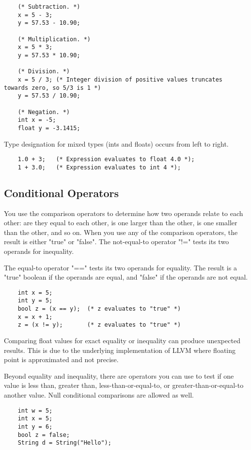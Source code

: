\begin{homeworkProblem}
\begin{verbatim}
	(* Subtraction. *)
	x = 5 - 3;
	y = 57.53 - 10.90;
	
	(* Multiplication. *)
	x = 5 * 3;
	y = 57.53 * 10.90;
	
	(* Division. *)
	x = 5 / 3; (* Integer division of positive values truncates towards zero, so 5/3 is 1 *)
	y = 57.53 / 10.90;
	
	(* Negation. *)
	int x = -5;
	float y = -3.1415;
	\end{verbatim}

	Type designation for mixed types (ints and floats) occurs from left to right.

	\begin{verbatim}
	1.0 + 3;   (* Expression evaluates to float 4.0 *);
	1 + 3.0;   (* Expression evaluates to int 4 *);
	\end{verbatim}
	
	\subsection{Conditional Operators}
	
	You use the comparison operators to determine how two operands relate to each other: are they equal to each other, is one larger than the other, is one smaller than the other, and so on. When you use any of the comparison operators, the result is either "true" or "false". The not-equal-to operator "!=" tests its two operands for inequality.
	
	The equal-to operator "==" tests its two operands for equality. The result is a "true" boolean if the operands are equal, and "false" if the operands are not equal.
	\begin{verbatim}
	int x = 5;
	int y = 5;
	bool z = (x == y);  (* z evaluates to "true" *)
	x = x + 1;
	z = (x != y);       (* z evaluates to "true" *)
	\end{verbatim}

	Comparing float values for exact equality or inequality can produce unexpected results. This is due to the underlying implementation of LLVM where floating point is approximated and not precise. 
	
	Beyond equality and inequality, there are operators you can use to test if one value is less than, greater than, less-than-or-equal-to, or greater-than-or-equal-to another value. Null conditional comparisons are allowed as well. 
	
	\begin{verbatim}
	int w = 5;
	int x = 5;
	int y = 6;
	bool z = false;
	String d = String("Hello");
	

\end{verbatim}
\end{homeworkProblem}
